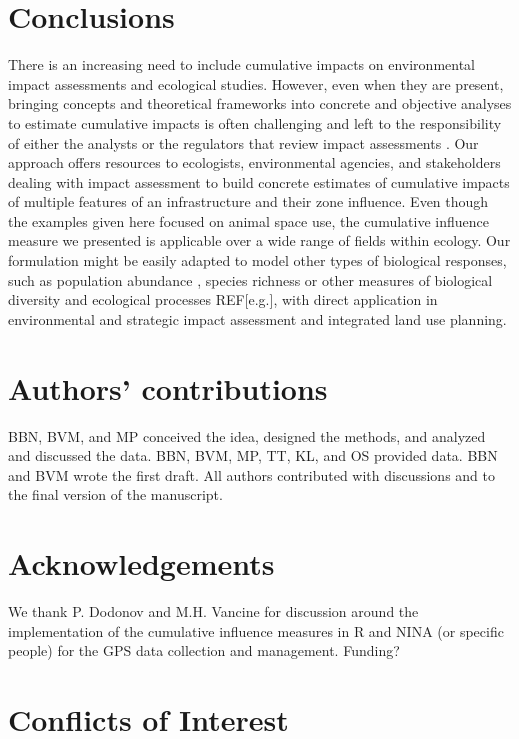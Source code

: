 \documentclass[titlepage]{article}
\begin{document}
\section{Conclusions}

There is an increasing need to include cumulative impacts on environmental impact assessments and ecological studies. However, even when they are present, bringing concepts and theoretical frameworks into concrete and objective analyses to estimate cumulative impacts is often challenging and left to the responsibility of either the analysts or the regulators that review impact assessments \citep{johnson_regulating_2011}. Our approach offers resources to ecologists, environmental agencies, and stakeholders dealing with impact assessment to build concrete estimates of cumulative impacts of multiple features of an infrastructure and their zone influence. 
Even though the examples given here focused on animal space use, the cumulative influence measure we presented is applicable over a wide range
of fields within ecology. Our formulation might be easily adapted to model other types of biological responses, such as population abundance \citep[e.g.][]{benitez-lopez_impacts_2010},
species richness \citep[e.g.][]{ficetola_ecological_2009} or other measures of biological diversity and ecological processes REF[e.g.], with direct application in environmental and strategic impact assessment and integrated land use planning.
      
\section*{Authors’ contributions}

BBN, BVM, and MP conceived the idea, designed the methods, and analyzed and discussed the data. BBN, BVM, MP, TT, KL, and OS provided data. BBN and BVM wrote the first draft. All authors contributed with discussions and to the final version of the manuscript.

\section*{Acknowledgements}

We thank P. Dodonov and M.H. Vancine for discussion around the implementation of the cumulative influence measures in R and NINA (or specific people) for the GPS data collection and management. Funding?

\section*{Conflicts of Interest}
\end{document}
